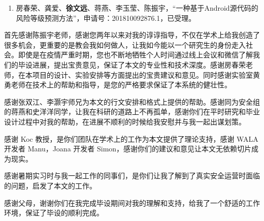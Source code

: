 \documentclass[oneside, master, review]{NJUthesis}
\theoremstyle{plain}
\begin{document}

\begin{enumerate}[label=\arabic*., labelindent=0em, leftmargin=*]
    \item 房春荣、龚爱、\textbf{徐文远}、蒋燕、李玉莹、陈振宇，``一种基于Android源代码的风险等级预测方法''，申请号：201810092876.1，已受理。
\end{enumerate}

\backmatter


\begin{thanks}

\vskip 18pt

首先感谢陈振宇老师，感谢您两年以来对我的谆谆指导，不仅在学术上给我创造了很多机会，更重要的是教会我如何做人，让我如今能以一个研究生的身份走入社会。即使是在疫情严重时期，您也不断地牺牲个人时间通过线上会议和微信了解我们的毕设进展，提出宝贵意见，保证了本文的专业性和技术深度。感谢房春荣老师，在本项目的设计、实验安排等方面提出的宝贵建议和意见。同时感谢实验室黄勇老师在技术上的帮助和指导，是您的严格要求保证了本系统的健壮性。

感谢张双江、李灏宇师兄为本文的行文安排和格式上提供的帮助。感谢同为安全组的蒋燕和史洋洋同学，让我在科研的道路上不再孤单，感谢你们在平时研究和毕业设计过程中对我的帮助，在进展不顺利的时候给我安慰并与我一起出谋划策。

感谢 Koc 教授，是你们团队在学术上的工作为本文提供了理论支持，感谢 WALA 开发者 Manu，Joana 开发者 Simon，感谢你们的建议和意见让本文无依赖切片成为现实。

感谢暑期实习时与我一起工作的同事们，是你们让我了解到了真实安全运营时面临的问题，启发了本文的工作。

感谢父母，谢谢你们在我完成毕设期间对我的理解和支持，给我了一个舒适的工作环境，保证了毕设的顺利完成。


\end{thanks}

\fi%
\makeatother
\end{document}

